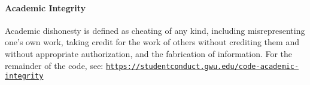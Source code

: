 \documentclass[11pt, reqno]{article}   	%
\begin{document}
\paragraph{Academic Integrity}
Academic dishonesty is defined as cheating of any kind, including misrepresenting one's own work, taking credit for the work of others without crediting them and without appropriate authorization, and the fabrication of information. 
For the remainder of the code, see: \href{https://studentconduct.gwu.edu/code-academic-integrity}{\texttt{https://studentconduct.gwu.edu/code-academic-integrity}}
\end{document}
